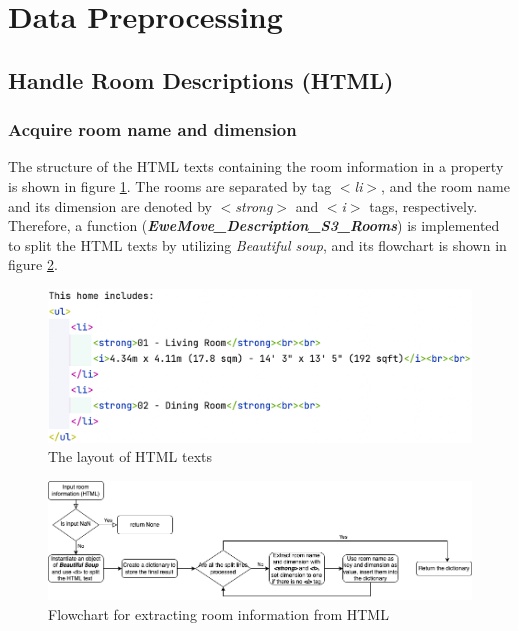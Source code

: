 \documentclass[12pt,twoside]{report}
\begin{document}
\section{Data Preprocessing}

\subsection{Handle Room Descriptions (HTML)}
\subsubsection{Acquire room name and dimension}
The structure of the HTML texts containing the room information in a property is shown in figure \ref{html_structure}. The rooms are separated by tag \textit{$<$li$>$}, and the room name and its dimension are denoted by \textit{$<$strong$>$} and \textit{$<$i$>$} tags, respectively. Therefore, a function (\textit{\textbf{EweMove\_Description\_S3\_Rooms}}) is implemented to split the HTML texts by utilizing \textit{Beautiful soup}, and its flowchart is shown in figure \ref{html_room_info}.
\begin{figure}[!htbp]
	\centering
	\includegraphics[width=15cm]{html_structure}
	\caption{The layout of HTML texts}
	\label{html_structure}
\end{figure}

\begin{figure}[!htbp]
	\centering
	\includegraphics[width=1\linewidth]{html_room_info}
	\caption{Flowchart for extracting room information from HTML}
	\label{html_room_info}
\end{figure}
\end{document}
